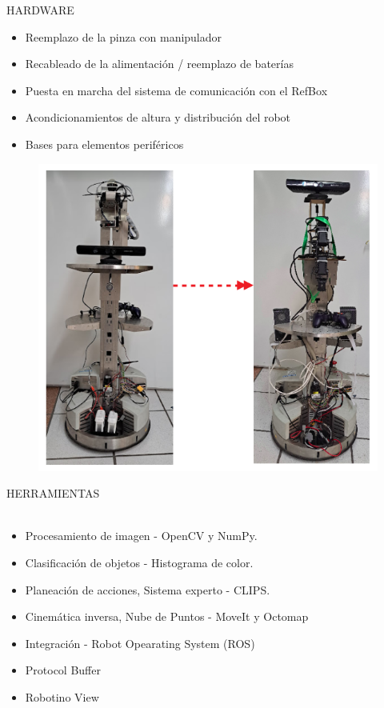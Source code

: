 \documentclass[handout,t]{beamer}
\begin{document}
\begin{frame}{HARDWARE}
\begin{itemize}
    \item Reemplazo de la pinza con manipulador
    \item Recableado de la alimentación / reemplazo de baterías
    \item Puesta en marcha del sistema de comunicación con el RefBox
    \item Acondicionamientos de altura y distribución del robot
    \item Bases para elementos periféricos
\end{itemize}
\begin{figure}[htp]
    \centering
    \includegraphics[scale=0.25]{NewerFigures/GlowUp.png}
\end{figure}
\end{frame}
\begin{frame}{HERRAMIENTAS}
\phantom{sd}\\
\phantom{sd}\\
\begin{itemize}
    \item Procesamiento de imagen - OpenCV y NumPy.
    \item Clasificación de objetos - Histograma de color.
    \item Planeación de acciones, Sistema experto - CLIPS.
    \item Cinemática inversa, Nube de Puntos - MoveIt y Octomap \cite{hornung_octomap_2013}
    \item Integración - Robot Opearating System (ROS)
    \item Protocol Buffer
    \item Robotino View
\end{itemize}
\end{frame}
\end{document}
